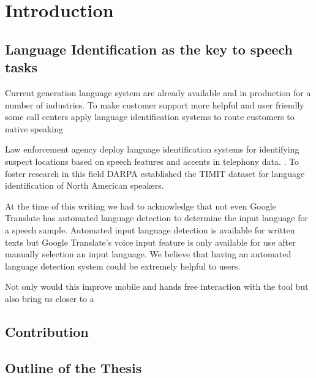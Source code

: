 \section{Introduction}

\subsection{Language Identification as the key to speech tasks}


Current generation language system are already available and in production for a number of industries. To make customer support more helpful and user friendly some call centers apply language identification systems to route customers to native speaking

Law enforcement agency deploy language identification systems for identifying suspect locations based on speech features and accents in telephony data. . To foster research in this field DARPA established the TIMIT dataset for language identification of North American speakers. 

At the time of this writing we had to acknowledge that not even Google Translate has automated language detection to determine the input language for a speech sample. Automated input language detection is available for written texts but Google Translate's voice input feature is only available for use after manually selection an input language. We believe that having an automated language detection system could be extremely helpful to users. 

Not only would this improve mobile and hands free interaction with the tool but also bring us closer to a



\subsection{Contribution}
\subsection{Outline of the Thesis}
